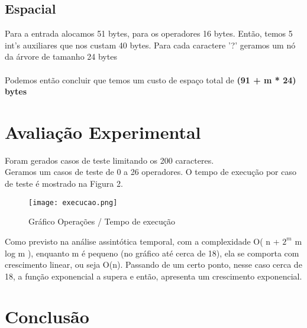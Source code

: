 \documentclass{article}
\begin{document}
\subsection{Espacial}

Para a entrada alocamos 51 bytes, para os operadores 16 bytes. Então, temos 5 int's auxiliares que nos custam 40 bytes. Para cada caractere '?' geramos um nó da árvore de tamanho 24 bytes
\\
\\
Podemos então concluir que temos um custo de espaço total de \textbf{(91 + m * 24) bytes}

\section{Avaliação Experimental}
Foram gerados casos de teste limitando os 200 caracteres.
\\
Geramos um casos de teste de 0 a 26 operadores. O tempo de execução por caso de teste é mostrado na Figura 2.
\begin{figure}[h!]
\renewcommand{\figurename}{Figura}
\centering
\texttt{[image: execucao.png]}
\caption{Gráfico Operações / Tempo de execução}
\label{fig:univerise}
\end{figure}
Como previsto na análise assintótica temporal, com a complexidade O( n + $2^m$ m log m ), enquanto m é pequeno (no gráfico até cerca de 18), ela se comporta com crescimento linear, ou seja O(n). Passando de um certo ponto, nesse caso cerca de 18, a função exponencial a supera e então, apresenta um crescimento exponencial.

\section{Conclusão}
\end{document}
